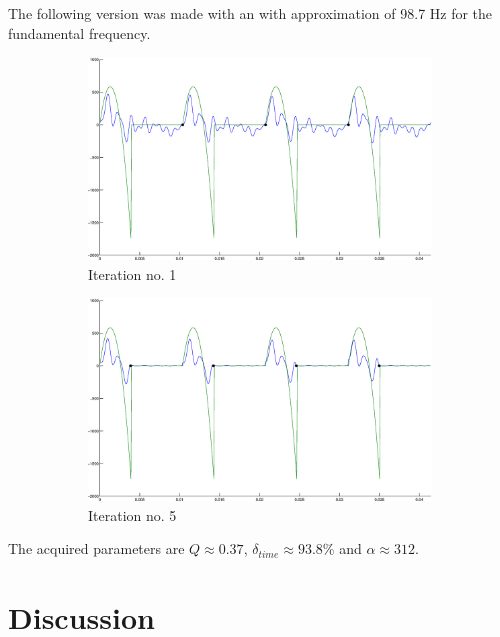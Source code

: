 \documentclass[12pt,a4]{article}
\begin{document}
The following version was made with an with approximation of 98.7 Hz for the fundamental frequency.
\begin{figure}[H]
 \centering
 \begin{subfigure}{.47\textwidth}
  \includegraphics[width=\textwidth]{img/Lasse-1.eps}
  \caption{Iteration no. 1}
 \end{subfigure}%
 \hspace{.05\textwidth}
 \begin{subfigure}{.47\textwidth}
  \includegraphics[width=\textwidth]{img/Lasse-5.eps}
  \caption{Iteration no. 5}
 \end{subfigure}
 \caption{}\label{fig:realData2}
 \end{figure}
 The acquired parameters are $Q \approx 0.37$, $\delta_{time} \approx 93.8\%$ and $\alpha \approx 312$.

\newpage

\section{Discussion}
\label{sec:discussion}
\end{document}
